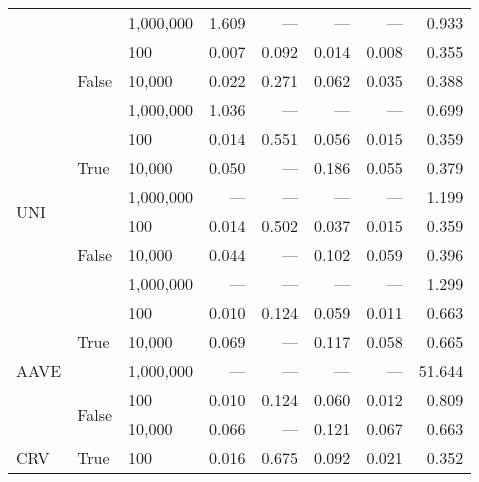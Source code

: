 \begin{tabular}{lllrrrrr}
                          &                        & 1,000,000       & 1.609   & ---    & ---   & ---   & 0.933   \\
    \cline{2-8}
                          & \multirow{3}{*}{False} & 100             & 0.007   & 0.092  & 0.014 & 0.008 & 0.355   \\
                          &                        & 10,000          & 0.022   & 0.271  & 0.062 & 0.035 & 0.388   \\
                          &                        & 1,000,000       & 1.036   & ---    & ---   & ---   & 0.699   \\
    \cline{1-8}
    \cline{2-8}
    \multirow{6}{*}{UNI}  & \multirow{3}{*}{True}  & 100             & 0.014   & 0.551  & 0.056 & 0.015 & 0.359   \\
                          &                        & 10,000          & 0.050   & ---    & 0.186 & 0.055 & 0.379   \\
                          &                        & 1,000,000       & ---     & ---    & ---   & ---   & 1.199   \\
    \cline{2-8}
                          & \multirow{3}{*}{False} & 100             & 0.014   & 0.502  & 0.037 & 0.015 & 0.359   \\
                          &                        & 10,000          & 0.044   & ---    & 0.102 & 0.059 & 0.396   \\
                          &                        & 1,000,000       & ---     & ---    & ---   & ---   & 1.299   \\
    \cline{1-8}
    \cline{2-8}
    \multirow{5}{*}{AAVE} & \multirow{3}{*}{True}  & 100             & 0.010   & 0.124  & 0.059 & 0.011 & 0.663   \\
                          &                        & 10,000          & 0.069   & ---    & 0.117 & 0.058 & 0.665   \\
                          &                        & 1,000,000       & ---     & ---    & ---   & ---   & 51.644  \\
    \cline{2-8}
                          & \multirow{2}{*}{False} & 100             & 0.010   & 0.124  & 0.060 & 0.012 & 0.809   \\
                          &                        & 10,000          & 0.066   & ---    & 0.121 & 0.067 & 0.663   \\
    \cline{1-8}
    \cline{2-8}
    \multirow{5}{*}{CRV}  & \multirow{3}{*}{True}  & 100             & 0.016   & 0.675  & 0.092 & 0.021 & 0.352   \\

\end{tabular}
